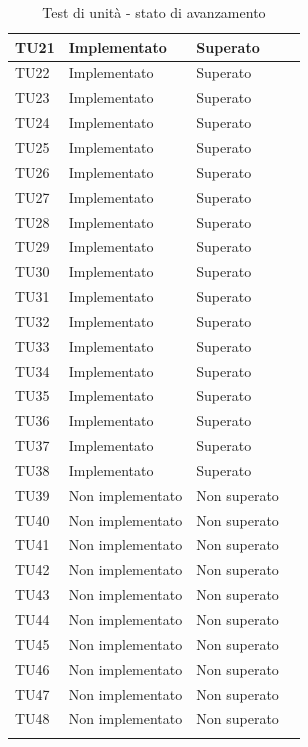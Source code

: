 \begin{longtable}{|>{\centering\arraybackslash}m{1.6cm}|>{\centering\arraybackslash}m{6.41cm}|>{\centering\arraybackslash}m{3.1cm}| c |}
	TU21 & Implementato & Superato \\ \hline
	TU22 & Implementato & Superato \\ \hline
	TU23 & Implementato & Superato \\ \hline
	TU24 & Implementato & Superato \\ \hline
	TU25 & Implementato & Superato \\ \hline		
	TU26 & Implementato & Superato \\ \hline
	TU27 & Implementato & Superato  \\ \hline
	TU28 & Implementato & Superato  \\ \hline
	TU29 & Implementato & Superato  \\ \hline
	TU30 & Implementato & Superato  \\ \hline
	TU31 & Implementato & Superato  \\ \hline
	TU32 & Implementato & Superato  \\ \hline
	TU33 & Implementato & Superato  \\ \hline
	TU34 & Implementato & Superato  \\ \hline
	TU35 & Implementato & Superato \\ \hline
	TU36 & Implementato & Superato \\ \hline
	TU37 & Implementato & Superato  \\ \hline
	TU38 & Implementato & Superato  \\ \hline
	TU39 & Non implementato & Non superato \\ \hline
	TU40 & Non implementato & Non superato \\ \hline
	TU41 & Non implementato & Non superato \\ \hline
	TU42 & Non implementato & Non superato \\ \hline
	TU43 & Non implementato & Non superato \\ \hline
	TU44 & Non implementato & Non superato \\ \hline
	TU45 & Non implementato & Non superato \\ \hline
	TU46 & Non implementato & Non superato \\ \hline
	TU47 & Non implementato & Non superato \\ \hline
	TU48 & Non implementato & Non superato \\ \hline
	\caption{Test di unità - stato di avanzamento}
\end{longtable}

